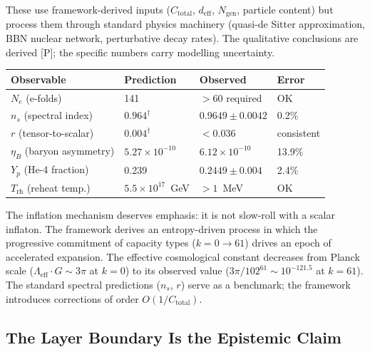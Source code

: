 \documentclass[11pt]{article}
\begin{document}
These use framework-derived inputs ($C_{\mathrm{total}}$, $d_{\mathrm{eff}}$, $N_{\mathrm{gen}}$, particle content) but process them through standard physics machinery (quasi-de Sitter approximation, BBN nuclear network, perturbative decay rates).  The qualitative conclusions are derived [P]; the specific numbers carry modelling uncertainty.

\smallskip
\begin{center}
\small
\begin{tabular}{llll}
\toprule
\textbf{Observable} & \textbf{Prediction} & \textbf{Observed} & \textbf{Error} \\
\midrule
$N_e$ (e-folds) & 141 & ${>}60$ required & OK \\
$n_s$ (spectral index) & $0.964^\dagger$ & $0.9649 \pm 0.0042$ & 0.2\% \\
$r$ (tensor-to-scalar) & $0.004^\dagger$ & ${<}0.036$ & consistent \\
$\eta_B$ (baryon asymmetry) & $5.27 \times 10^{-10}$ & $6.12 \times 10^{-10}$ & 13.9\% \\
$Y_p$ (He-4 fraction) & 0.239 & $0.2449 \pm 0.004$ & 2.4\% \\
$T_{\mathrm{rh}}$ (reheat temp.) & $5.5 \times 10^{17}$~GeV & ${>}1$~MeV & OK \\
\bottomrule
\end{tabular}
\end{center}
\smallskip


The inflation mechanism deserves emphasis: it is not slow-roll with a scalar inflaton.  The framework derives an entropy-driven process in which the progressive commitment of capacity types ($k = 0 \to 61$) drives an epoch of accelerated expansion.  The effective cosmological constant decreases from Planck scale ($\Lambda_{\mathrm{eff}}\cdot G \sim 3\pi$ at $k=0$) to its observed value ($3\pi/102^{61} \sim 10^{-121.5}$ at $k=61$).  The standard spectral predictions ($n_s$, $r$) serve as a benchmark; the framework introduces corrections of order $O(1/C_{\mathrm{total}})$.


\subsection{The Layer Boundary Is the Epistemic Claim}
\end{document}
